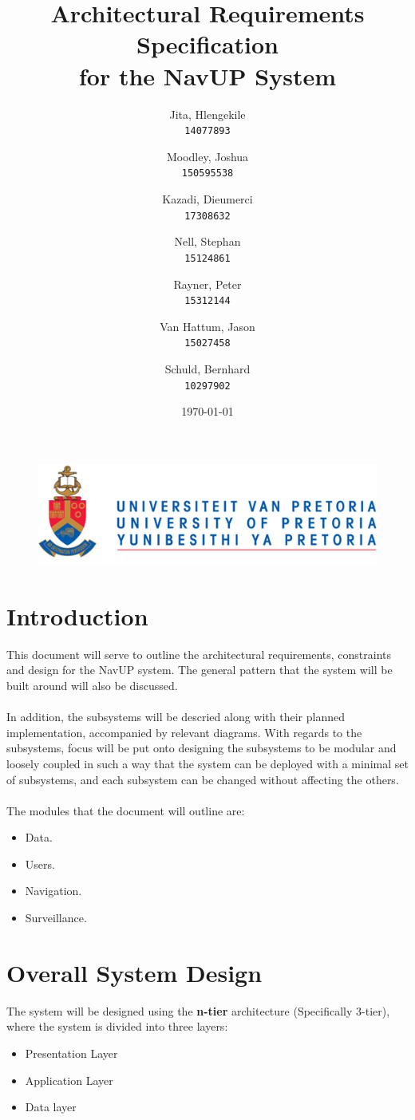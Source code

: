 \documentclass[english]{article}
\author{
	Jita, Hlengekile\\
	\texttt{14077893}
	\and
	Moodley, Joshua\\
	\texttt{150595538}
	\and
	Kazadi, Dieumerci\\
	\texttt{17308632}
	\and
	Nell, Stephan\\
	\texttt{15124861}
	\and
	Rayner, Peter\\
	\texttt{15312144}
	\and
	Van Hattum, Jason\\
	\texttt{15027458}
	\and
	Schuld, Bernhard\\
	\texttt{10297902}
}
\title{Architectural Requirements Specification\\
	for the NavUP System\\
	}
\date{\today}
\begin{document}
    \fboxsep=2mm

	\maketitle
	\begin{figure}[!t]
		\includegraphics{up_logo.png}
	\end{figure}
	\newpage

	\tableofcontents
	\newpage



	\section{Introduction}

		This document will serve to outline the architectural requirements, constraints and design for the NavUP system. The general pattern that the system will be built around will also be discussed.\\
        \\
		In addition, the subsystems will be descried along with their planned implementation, accompanied by relevant diagrams. With regards to the subsystems, focus will be put onto designing the subsystems to be modular and loosely coupled in such a way that the system can be deployed with a minimal set of subsystems, and each subsystem can be changed without affecting the others.\\
		\\
		The modules that the document will outline are:
		\begin{itemize}
		    \item Data.
		    \item Users.
		    \item Navigation.
		    \item Surveillance.
		\end{itemize}

	\section{Overall System Design}
	    The system will be designed using the \textbf{n-tier} architecture (Specifically 3-tier), where the system is divided into three layers:
	    \begin{itemize}
	        \item Presentation Layer
	        \item Application Layer
	        \item Data layer
	    \end{itemize}
\end{document}

